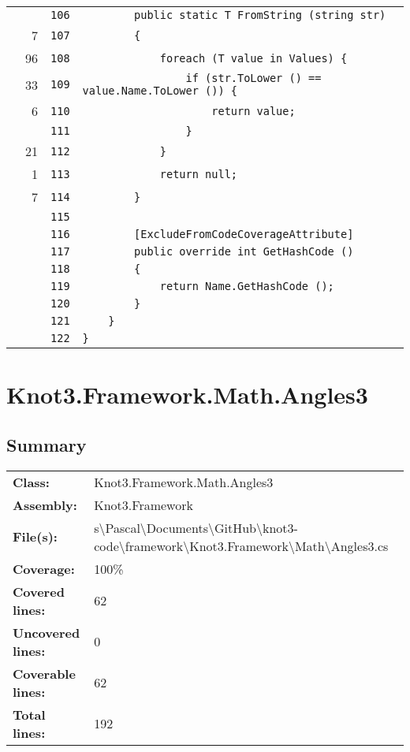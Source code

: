 \documentclass[a4paper,10pt]{article}
\begin{document}
\begin{longtable}[l]{lrrl}
\cellcolor{gray} &  & \verb~106~ & \verb~        public static T FromString (string str)~\\
\cellcolor{green} & 7 & \verb~107~ & \verb~        {~\\
\cellcolor{green} & 96 & \verb~108~ & \verb~            foreach (T value in Values) {~\\
\cellcolor{green} & 33 & \verb~109~ & \verb~                if (str.ToLower () == value.Name.ToLower ()) {~\\
\cellcolor{green} & 6 & \verb~110~ & \verb~                    return value;~\\
\cellcolor{gray} &  & \verb~111~ & \verb~                }~\\
\cellcolor{green} & 21 & \verb~112~ & \verb~            }~\\
\cellcolor{green} & 1 & \verb~113~ & \verb~            return null;~\\
\cellcolor{green} & 7 & \verb~114~ & \verb~        }~\\
\cellcolor{gray} &  & \verb~115~ & \verb~~\\
\cellcolor{gray} &  & \verb~116~ & \verb~        [ExcludeFromCodeCoverageAttribute]~\\
\cellcolor{gray} &  & \verb~117~ & \verb~        public override int GetHashCode ()~\\
\cellcolor{gray} &  & \verb~118~ & \verb~        {~\\
\cellcolor{gray} &  & \verb~119~ & \verb~            return Name.GetHashCode ();~\\
\cellcolor{gray} &  & \verb~120~ & \verb~        }~\\
\cellcolor{gray} &  & \verb~121~ & \verb~    }~\\
\cellcolor{gray} &  & \verb~122~ & \verb~}~\\
\end{longtable}
\newpage
\section{Knot3.Framework.Math.Angles3}
\subsection{Summary}
\begin{longtable}[l]{ll}
\textbf{Class:} & Knot3.Framework.Math.Angles3\\
\textbf{Assembly:} & Knot3.Framework\\
\textbf{File(s):} & \begin{minipage}[t]{12cm}{s\textbackslash Pascal\textbackslash Documents\textbackslash GitHub\textbackslash knot3-code\textbackslash framework\textbackslash Knot3.Framework\textbackslash Math\textbackslash Angles3.cs}\end{minipage} \\
\textbf{Coverage:} & 100\%\\
\textbf{Covered lines:} & 62\\
\textbf{Uncovered lines:} & 0\\
\textbf{Coverable lines:} & 62\\
\textbf{Total lines:} & 192\\
\end{longtable}
\end{document}
